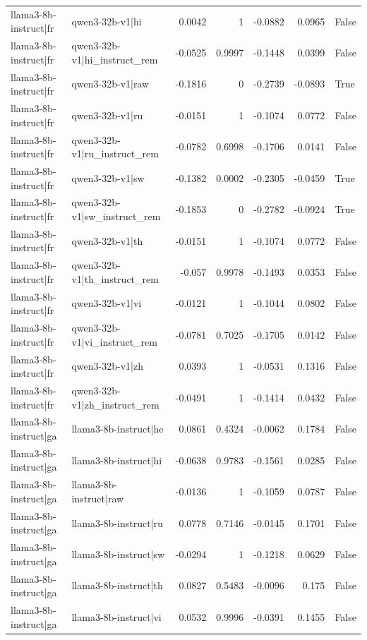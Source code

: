 \begin{table}
\begin{tabular}{l l r r r r l}
llama3-8b-instruct|fr & qwen3-32b-v1|hi & 0.0042 & 1 & -0.0882 & 0.0965 & False \\
llama3-8b-instruct|fr & qwen3-32b-v1|hi_instruct_rem & -0.0525 & 0.9997 & -0.1448 & 0.0399 & False \\
llama3-8b-instruct|fr & qwen3-32b-v1|raw & -0.1816 & 0 & -0.2739 & -0.0893 & True \\
llama3-8b-instruct|fr & qwen3-32b-v1|ru & -0.0151 & 1 & -0.1074 & 0.0772 & False \\
llama3-8b-instruct|fr & qwen3-32b-v1|ru_instruct_rem & -0.0782 & 0.6998 & -0.1706 & 0.0141 & False \\
llama3-8b-instruct|fr & qwen3-32b-v1|sw & -0.1382 & 0.0002 & -0.2305 & -0.0459 & True \\
llama3-8b-instruct|fr & qwen3-32b-v1|sw_instruct_rem & -0.1853 & 0 & -0.2782 & -0.0924 & True \\
llama3-8b-instruct|fr & qwen3-32b-v1|th & -0.0151 & 1 & -0.1074 & 0.0772 & False \\
llama3-8b-instruct|fr & qwen3-32b-v1|th_instruct_rem & -0.057 & 0.9978 & -0.1493 & 0.0353 & False \\
llama3-8b-instruct|fr & qwen3-32b-v1|vi & -0.0121 & 1 & -0.1044 & 0.0802 & False \\
llama3-8b-instruct|fr & qwen3-32b-v1|vi_instruct_rem & -0.0781 & 0.7025 & -0.1705 & 0.0142 & False \\
llama3-8b-instruct|fr & qwen3-32b-v1|zh & 0.0393 & 1 & -0.0531 & 0.1316 & False \\
llama3-8b-instruct|fr & qwen3-32b-v1|zh_instruct_rem & -0.0491 & 1 & -0.1414 & 0.0432 & False \\
llama3-8b-instruct|ga & llama3-8b-instruct|he & 0.0861 & 0.4324 & -0.0062 & 0.1784 & False \\
llama3-8b-instruct|ga & llama3-8b-instruct|hi & -0.0638 & 0.9783 & -0.1561 & 0.0285 & False \\
llama3-8b-instruct|ga & llama3-8b-instruct|raw & -0.0136 & 1 & -0.1059 & 0.0787 & False \\
llama3-8b-instruct|ga & llama3-8b-instruct|ru & 0.0778 & 0.7146 & -0.0145 & 0.1701 & False \\
llama3-8b-instruct|ga & llama3-8b-instruct|sw & -0.0294 & 1 & -0.1218 & 0.0629 & False \\
llama3-8b-instruct|ga & llama3-8b-instruct|th & 0.0827 & 0.5483 & -0.0096 & 0.175 & False \\
llama3-8b-instruct|ga & llama3-8b-instruct|vi & 0.0532 & 0.9996 & -0.0391 & 0.1455 & False \\

\end{tabular}
\end{table}
